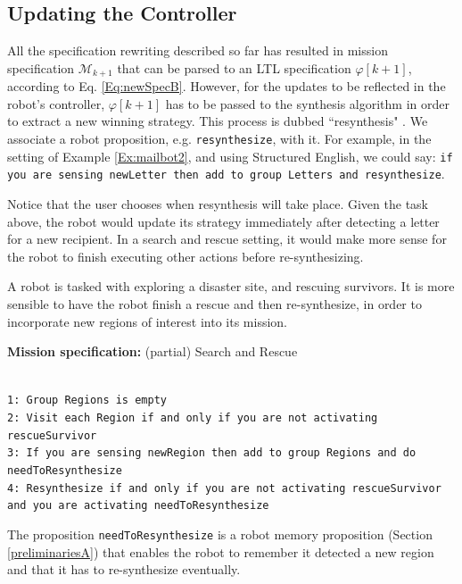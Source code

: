\subsection{Updating the Controller}

All the specification rewriting described so far has resulted in mission specification $\mathcal{M}_{k+1}$ that can be parsed to an LTL specification $\varphi [k+1]$, according to Eq. \eqref{Eq:newSpecB}. However, for the updates to be reflected in the robot's controller, $\varphi [k+1]$ has to be passed to the synthesis algorithm in order to extract a new winning strategy. This process is dubbed ``resynthesis" \cite{BingxinRSS2012}. We associate a robot proposition, e.g. \texttt{resynthesize}, with it. For example, in the setting of Example \ref{Ex:mailbot2}, and using Structured English, we could say:
\texttt{if you are sensing newLetter then add to group Letters and resynthesize}. 

Notice that the user chooses when resynthesis will take place. Given the task above, the robot would update its strategy immediately after detecting a letter for a new recipient. In a search and rescue setting, it would make more sense for the robot to finish executing other actions before re-synthesizing.

\begin{myExample}\label{Ex:SnS} A robot is tasked with exploring a disaster site, and rescuing survivors. It is more sensible to have the robot finish a rescue and then re-synthesize, in order to incorporate new regions of interest into its mission.
	\begin{algorithm}
	\textbf{Mission specification:} (partial) Search and Rescue
	
	\vspace{-6 pt}
	\hrulefill\\
	{\small
	\texttt{1: Group Regions is empty}\\
	\texttt{2: Visit each Region if and only if you are not activating rescueSurvivor}\\
	\texttt{3: If you are sensing newRegion then add to group Regions and do needToResynthesize}\\	
	\texttt{4: Resynthesize if and only if you are not activating rescueSurvivor and you are activating needToResynthesize}\\
	}
	\vspace{-10 pt}
	\end{algorithm}
	
The proposition \texttt{needToResynthesize} is a robot memory proposition (Section \ref{preliminariesA}) that enables the robot to remember it detected a new region and that it has to re-synthesize eventually.
\end{myExample}

